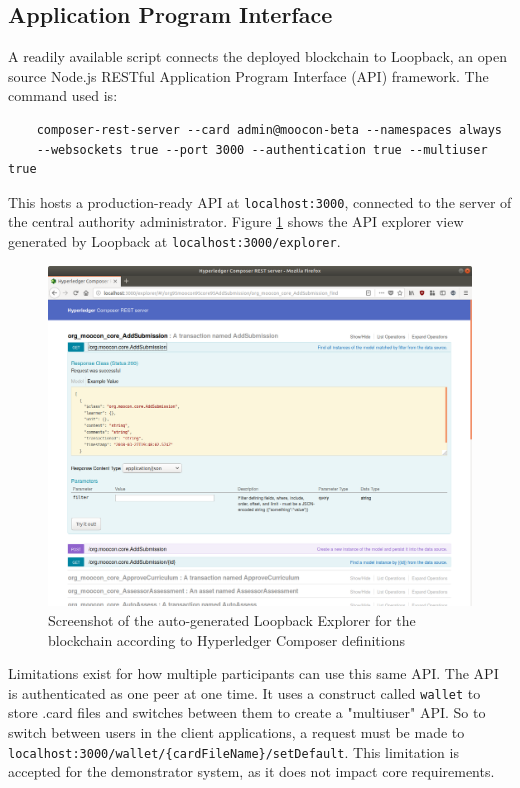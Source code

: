 \subsection{Application Program Interface}

A readily available script connects the deployed blockchain to Loopback, an open source Node.js RESTful
Application Program Interface (API) framework. The command used is:

\begin{verbatim}
	composer-rest-server --card admin@moocon-beta --namespaces always 
	--websockets true --port 3000 --authentication true --multiuser true
\end{verbatim}

This hosts a production-ready API at \texttt{localhost:3000}, connected to the
server of the central authority administrator.
Figure \ref{fig:Loopback_explorer} shows the API explorer view generated by Loopback at \texttt{localhost:3000/explorer}.

\begin{figure}[!ht]
	\centering
	\includegraphics[width=1.0\textwidth]{Loopback_explorer}
	\caption[Hyperledger Composer Loopback REST API Screenshot]
	{Screenshot of the auto-generated Loopback Explorer for the blockchain according to Hyperledger Composer definitions}
	\label{fig:Loopback_explorer}
\end{figure}

Limitations exist for how multiple participants can use this same API. The API is authenticated as
one peer at one time. It uses a construct called \texttt{wallet} to store .card files and
switches between them to create a "multiuser" API. So to switch between users in the
client applications, a request must be made to \texttt{localhost:3000/wallet/\{cardFileName\}/setDefault}.
This limitation is accepted for the demonstrator system, as it does not impact core requirements.

